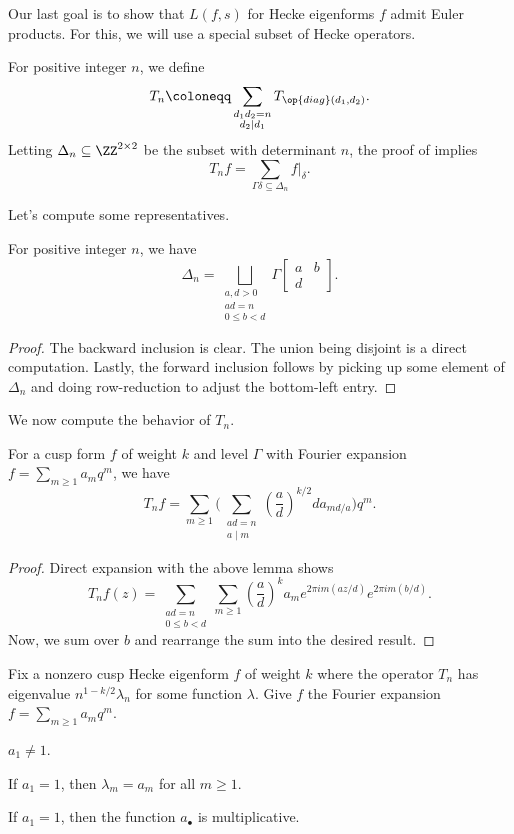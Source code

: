 \documentclass{article}
\begin{document}
Our last goal is to show that $L(f,s)$ for Hecke eigenforms $f$ admit Euler products. For this, we will use a special subset of Hecke operators.
\begin{notation}
	For positive integer $n$, we define
	\[T_n\coloneqq\sum_{\substack{d_1d_2=n\\d_2\mid d_1}}T_{\op{diag}(d_1,d_2)}.\]
	Letting $\Delta_n\subseteq\ZZ^{2\times2}$ be the subset with determinant $n$, the proof of  implies
	\[T_nf=\sum_{\Gamma\delta\subseteq\Delta_n}f|_\delta.\]
\end{notation}
Let's compute some representatives.
\begin{lemma}
	For positive integer $n$, we have
	\[\Delta_n=\bigsqcup_{\substack{a,d>0\\ad=n\\0\le b<d}}\Gamma\begin{bmatrix}
		a & b \\ d
	\end{bmatrix}.\]
\end{lemma}
\begin{proof}
	The backward inclusion is clear. The union being disjoint is a direct computation. Lastly, the forward inclusion follows by picking up some element of $\Delta_n$ and doing row-reduction to adjust the bottom-left entry.
\end{proof}
We now compute the behavior of $T_n$.
\begin{lemma} \label{lem:compute-hecke-operator}
	For a cusp form $f$ of weight $k$ and level $\Gamma$ with Fourier expansion $f=\sum_{m\ge1}a_mq^m$, we have
	\[T_nf=\sum_{m\ge1}\Bigg(\sum_{\substack{ad=n\\a\mid m}}\left(\frac ad\right)^{k/2}da_{md/a}\Bigg)q^m.\]
\end{lemma}
\begin{proof}
	Direct expansion with the above lemma shows
	\[T_nf(z)=\sum_{\substack{ad=n\\0\le b<d}}\sum_{m\ge1}\left(\frac ad\right)^ka_me^{2\pi im(az/d)}e^{2\pi im(b/d)}.\]
	Now, we sum over $b$ and rearrange the sum into the desired result.
\end{proof}
\begin{lemma}
	Fix a nonzero cusp Hecke eigenform $f$ of weight $k$ where the operator $T_n$ has eigenvalue $n^{1-k/2}\lambda_n$ for some function $\lambda$. Give $f$ the Fourier expansion $f=\sum_{m\ge1}a_mq^m$.
	\begin{listalph}
		\item $a_1\ne1$.
		\item If $a_1=1$, then $\lambda_m=a_m$ for all $m\ge1$.
		\item If $a_1=1$, then the function $a_\bullet$ is multiplicative.
	\end{listalph}
\end{lemma}
\end{document}

